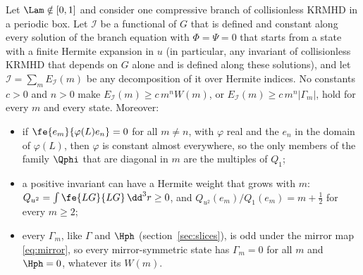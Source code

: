 \begin{proposition}\label{prop:nofjortoft}
Let $\Lam\notin[0,1]$ and consider one compressive branch of collisionless KRMHD in a periodic box. Let $\mathcal I$ be a functional of $G$ that is defined and constant along every solution of the branch equation with $\Phi=\Psi=0$ that starts from a state with a finite Hermite expansion in $u$ (in particular, any invariant of collisionless KRMHD that depends on $G$ alone and is defined along these solutions), and let $\mathcal I=\sum_mE_{\mathcal I}(m)$ be any decomposition of it over Hermite indices. No constants $c>0$ and $n>0$ make $E_{\mathcal I}(m)\ge c\,m^nW(m)$, or $E_{\mathcal I}(m)\ge c\,m^n|\Gamma_m|$, hold for every $m$ and every state. Moreover:
\begin{itemize}
\item[(a)] if $\fe{e_m}{\varphi(L)e_n}=0$ for all $m\ne n$, with $\varphi$ real and the $e_n$ in the domain of $\varphi(L)$, then $\varphi$ is constant almost everywhere, so the only members of the family $\Qphi$ that are diagonal in $m$ are the multiples of $Q_1$;
\item[(b)] a positive invariant can have a Hermite weight that grows with $m$: $Q_{u^2}=\int\fe{LG}{LG}\,\dd^3r\ge0$, and $Q_{u^2}(e_m)/Q_1(e_m)=m+\frac12$ for every $m\ge2$;
\item[(c)] every $\Gamma_m$, like $\Gamma$ and $\Hph$ (section~\ref{sec:slices}), is odd under the mirror map \eqref{eq:mirror}, so every mirror-symmetric state has $\Gamma_m=0$ for all $m$ and $\Hph=0$, whatever its $W(m)$.
\end{itemize}
\end{proposition}

